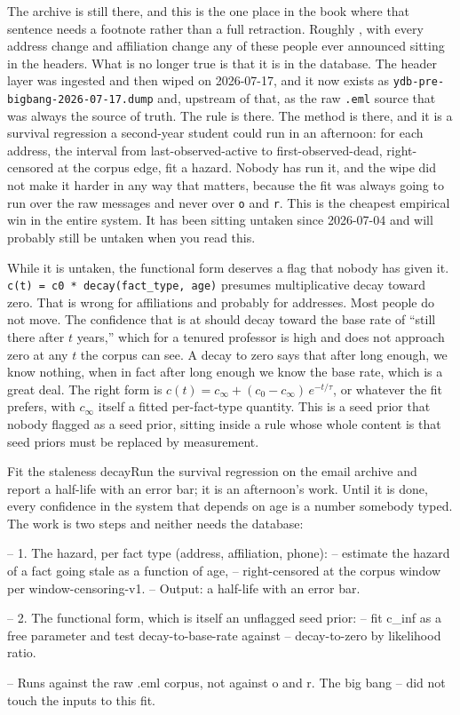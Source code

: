 The archive is still there, and this is the one place in the book where that sentence needs a footnote rather than a full retraction. Roughly \labMailCorpus{}, with every address change and affiliation change any of these people ever announced sitting in the headers. What is no longer true is that it is in the database. The header layer was ingested and then wiped on 2026-07-17, and it now exists as \texttt{ydb-pre-bigbang-2026-07-17.dump} and, upstream of that, as the raw \texttt{.eml} source that was always the source of truth. The rule is there. The method is there, and it is a survival regression a second-year student could run in an afternoon: for each address, the interval from last-observed-active to first-observed-dead, right-censored at the corpus edge, fit a hazard. Nobody has run it, and the wipe did not make it harder in any way that matters, because the fit was always going to run over the raw messages and never over \texttt{o} and \texttt{r}. This is the cheapest empirical win in the entire system. It has been sitting untaken since 2026-07-04 and will probably still be untaken when you read this.

While it is untaken, the functional form deserves a flag that nobody has given it. \texttt{c(t) = c0 * decay(fact\_type, age)} presumes multiplicative decay toward zero. That is wrong for affiliations and probably for addresses. Most people do not move. The confidence that \labPerson{} is at \labVenue{} should decay toward the base rate of ``still there after $t$ years,'' which for a tenured professor is high and does not approach zero at any $t$ the corpus can see. A decay to zero says that after long enough, we know nothing, when in fact after long enough we know the base rate, which is a great deal. The right form is $c(t) = c_\infty + (c_0 - c_\infty)\,e^{-t/\tau}$, or whatever the fit prefers, with $c_\infty$ itself a fitted per-fact-type quantity. This is a seed prior that nobody flagged as a seed prior, sitting inside a rule whose whole content is that seed priors must be replaced by measurement.

\begin{Open}{Fit the staleness decay}{Run the survival regression on the email archive and report a half-life with an error bar; it is an afternoon's work.}
Until it is done, every confidence in the system that depends on age is a number somebody typed. The work is two steps and neither needs the database:

\begin{Check}
-- 1. The hazard, per fact type (address, affiliation, phone):
--    estimate the hazard of a fact going stale as a function of age,
--    right-censored at the corpus window per window-censoring-v1.
--    Output: a half-life with an error bar.

-- 2. The functional form, which is itself an unflagged seed prior:
--    fit c_inf as a free parameter and test decay-to-base-rate against
--    decay-to-zero by likelihood ratio.

-- Runs against the raw .eml corpus, not against o and r. The big bang
-- did not touch the inputs to this fit.
\end{Check}
\end{Open}

